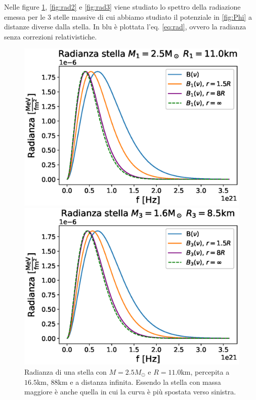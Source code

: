 \documentclass[a4paper, titlepage]{article}
\begin{document}
Nelle figure \ref{fig:rad1}, \ref{fig:rad2} e \ref{fig:rad3} viene studiato lo
spettro della radiazione emessa per le 3 stelle massive di cui abbiamo studiato
il potenziale in \ref{fig:Phi} a distanze diverse dalla stella.
In blu è plottata l'eq. \ref{eq:rad}, ovvero la radianza senza correzioni
relativistiche.

\begin{figure}[h]
    \begin{minipage}{0.49\textwidth}
        \centering
        \includegraphics[width = \textwidth]{Figures/radianza1.eps}
        \caption{Radianza di una stella con $M = 2.5M_\odot$ e
        $R = 11.0\unit{\kilo\meter}$, percepita a $16.5 \unit{\kilo\meter}$,
        $88 \unit{\kilo\meter}$ e a distanza infinita.
        Essendo la stella con massa maggiore è anche quella in cui la curva è
        più spostata verso sinistra.}
        \label{fig:rad1}
    \end{minipage}
    \hspace{0.015\textwidth}    
    \begin{minipage}{0.49\textwidth}
        \centering
        \includegraphics[width = \textwidth]{Figures/radianza3.eps}

\end{minipage}
\end{figure}
\end{document}
